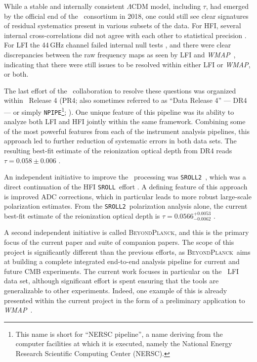 \documentclass[twocolumn]{aa}
\def\WMAP{\emph{WMAP}}
\newcommand{\BP}{\textsc{BeyondPlanck}}
\newcommand{\npipe}[0]{\texttt{NPIPE}}
\newcommand{\sroll}[0]{\texttt{SROLL}}
\newcommand{\srollTwo}[0]{\texttt{SROLL2}}
\begin{document}
While a stable and internally consistent $\Lambda$CDM model, including
$\tau$, had emerged by the official end of the \Planck\ consortium in
2018, one could still see clear signatures of residual systematics
present in various subsets of the data. For HFI, several internal
cross-correlations did not agree with each other to statistical
precision \citep{planck2016-l03}. For LFI the 44\,GHz channel failed
internal null tests \citep{planck2016-l02}, and there were clear
discrepancies between the raw frequency maps as seen by LFI and
\WMAP\ \citep{planck2016-l04}, indicating that there were still issues
to be resolved within either LFI or \WMAP, or both.

The last effort of the \Planck\ collaboration to resolve these
questions was organized within \Planck\ Release 4 (PR4; also sometimes referred to as ``Data Release 4'' --- DR4 --- or simply \npipe\footnote{This name is short for ``NERSC
  pipeline'', a name deriving from the computer facilities at which it
  is executed, namely the National Energy Research Scientific
  Computing Center (NERSC).}; \citealp{planck2020-LVII}). One
unique feature of this pipeline was its ability to analyze both LFI
and HFI jointly within the same framework. Combining some of the most
powerful features from each of the instrument analysis pipelines, this
approach led to further reduction of systematic errors in both data
sets. The resulting best-fit estimate of the reionization optical
depth from DR4 reads $\tau=0.058\pm0.006$ \citep{tristram:2020}.

An independent initiative to improve the \Planck\ processing was
\srollTwo\ \citep{delouis:2019}, which was a direct continuation of the
HFI \sroll\ effort \citep{planck2016-l03}. A defining feature of this
approach is improved ADC corrections, which in particular leads to
more robust large-scale polarization estimates. From the
\srollTwo\ polarization analysis alone, the current best-fit estimate
of the reionization optical depth is $\tau=0.0566^{+0.0053}_{-0.0062}$
\citep{pagano:2020}.

A second independent initiative is called \BP, and this is the primary
focus of the current paper and suite of companion papers. The scope of
this project is significantly different than the previous efforts, as
\BP\ aims at building a complete integrated end-to-end analysis
pipeline for current and future CMB experiments. The current work
focuses in particular on the \Planck\ LFI data set, although
significant effort is spent ensuring that the tools are generalizable
to other experiments. Indeed, one example of this is already presented
within the current project in the form of a preliminary application to
\WMAP\ \citep{bennett2012,bp17}.
\end{document}
